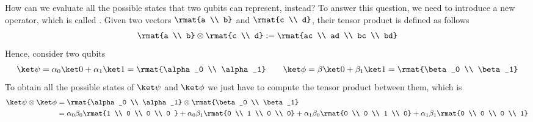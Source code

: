 \documentclass[a4paper, 12pt]{report}
\begin{document}
How can we evaluate all the possible states that two qubits can represent, instead? To answer this question, we need to introduce a new operator, which is called . Given two vectors $\rmat{a \\ b}$ and $\rmat{c \\ d}$, their tensor product is defined as follows $$\rmat{a \\ b} \otimes \rmat{c \\ d} := \rmat{ac \\ ad \\ bc \\ bd}$$ Hence, consider two qubits $$\ket \psi = \alpha_0 \ket 0 + \alpha_1 \ket 1 = \rmat{\alpha_0 \\ \alpha_1} \quad \quad \ket \phi = \beta \ket 0 + \beta_1 \ket 1 = \rmat{\beta_0 \\ \beta_1}$$ To obtain all the possible states of $\ket \psi$ and $\ket \phi$ we just have to compute the tensor product between them, which is
\begin{equation*}
	\begin{split}
		\ket \psi \otimes \ket \phi & = \rmat{\alpha_0           \\ \alpha_1} \otimes \rmat{\beta_0 \\ \beta_1} \\
		                            & = \alpha_0 \beta_0 \rmat{1 \\ 0 \\ 0 \\ 0 } + \alpha_0 \beta_1 \rmat{0 \\ 1 \\ 0 \\ 0} + \alpha_1 \beta_0 \rmat{0 \\ 0 \\ 1 \\ 0} + \alpha_1 \beta_1 \rmat{0 \\ 0 \\ 0 \\ 1}
	\end{split}
\end{equation*}
\end{document}
